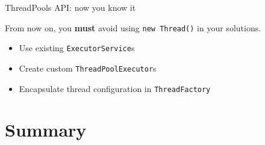 % 
% 
% 
% 
% 

\begin{frame}[fragile]{ThreadPools API: now you know it}

From now on, you \textbf{must} avoid using \texttt{new Thread()} in your solutions.

\begin{itemize}
    \item Use existing \texttt{ExecutorService}s
    \item Create custom \texttt{ThreadPoolExecutor}s
    \item Encapsulate thread configuration in \texttt{ThreadFactory}
\end{itemize}

\end{frame}

\section{Summary}

